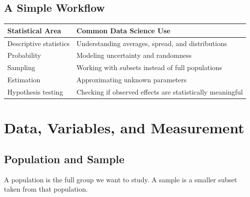 \documentclass[11pt,a4paper]{article}
\begin{document}
\subsection{A Simple Workflow}

\begin{center}
\end{center}

\begin{longtable}{L{3.5cm}L{7.9cm}}
\toprule
\textbf{Statistical Area} & \textbf{Common Data Science Use} \\
\midrule
Descriptive statistics & Understanding averages, spread, and distributions \\
Probability & Modeling uncertainty and randomness \\
Sampling & Working with subsets instead of full populations \\
Estimation & Approximating unknown parameters \\
Hypothesis testing & Checking if observed effects are statistically meaningful \\
\bottomrule
\end{longtable}

\section{Data, Variables, and Measurement}

\subsection{Population and Sample}

\begin{definitionbox}
A population is the full group we want to study. A sample is a smaller subset taken from that population.
\end{definitionbox}
\end{document}
